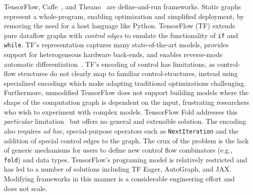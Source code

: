 TensorFlow, Caffe~\citep{caffe}, and Theano~\citep{theano} are define-and-run frameworks.
Static graphs represent a whole-program,
  enabling optimization and simplified deployment,
  by removing the need for a host language like Python.
TensorFlow (TF) extends pure dataflow graphs with \textit{control edges}
      to emulate the functionality of \verb|if| and \verb|while|.
TF's representation captures many state-of-the-art models,
      provides support for heterogeneous hardware back-ends,
      and enables reverse-mode automatic differentiation~{\citep{ad_survey, tensorflow}}.
TF's encoding of control has limitations, as control-flow structures
    do not clearly map to familiar control-structures, instead using specialized
    encodings which make adapting traditional optimizations challenging.
Furthermore,
    unmodified TensorFlow does not support building models where the shape of
    the computation graph is dependent on the input,
    frustrating researchers who wish to experiment with complex models.
TensorFlow Fold addresses this \textit{particular} limitation~\citep{tensorflowfold}
    but offers no general and extensible solution.
The encoding also requires \textit{ad hoc}, special-purpose operators such
    as \verb|NextIteration| and the addition of special control edges to the graph.
The crux of the problem is the lack of generic mechanisms for users to
    define new control flow combinators (e.g., \verb|fold|) and data types.
TensorFlow's programing model is relatively restricted and has led to a number
    of solutions including TF Eager, AutoGraph, and JAX.
Modifying frameworks in this manner is a considerable engineering effort
    and does not scale.


